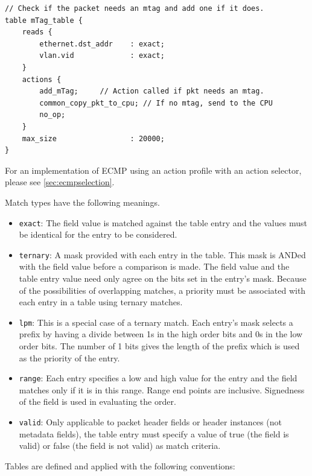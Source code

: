 \documentclass[12pt]{article}
\begin{document}
\begin{lstlisting}[keywords={},frame=single,escapechar=\@]
// Check if the packet needs an mtag and add one if it does.
table mTag_table {
    reads {
        ethernet.dst_addr    : exact;
        vlan.vid             : exact;
    }
    actions {
        add_mTag;     // Action called if pkt needs an mtag.
        common_copy_pkt_to_cpu; // If no mtag, send to the CPU
        no_op;
    }
    max_size                 : 20000;
}
\end{lstlisting}

For an implementation of ECMP using an action profile with an action selector,
please see \ref{sec:ecmpselection}.


Match types have the following meanings.

\begin{itemize}
\item
\texttt{exact}: The field value is matched against the table entry and the values
must be identical for the entry to be considered.
\item
\texttt{ternary}:  A mask provided with each entry in the table. This mask is ANDed
with the field value before a comparison is made.  The field value and the
table entry value need only agree on the bits set in the entry's mask.  Because
of the possibilities of overlapping matches, a priority must be associated
with each entry in a table using ternary matches.
\item
\texttt{lpm}:  This is a special case of a ternary match. Each entry's mask selects
a prefix by having a divide between 1s in the high order bits and 0s in the
low order bits. The number of 1 bits gives the length of the prefix which
is used as the priority of the entry.
\item
\texttt{range}: Each entry specifies a low and high value for the entry and the field
matches only if it is in this range. Range end points are inclusive. Signedness
of the field is used in evaluating the order.
\item
\texttt{valid}: Only applicable to packet header fields or header instances (not metadata
fields), the table entry must specify a value of true (the field is valid)
or false (the field is not valid) as match criteria.
\end{itemize}


Tables are defined and applied with the following conventions:
\end{document}
